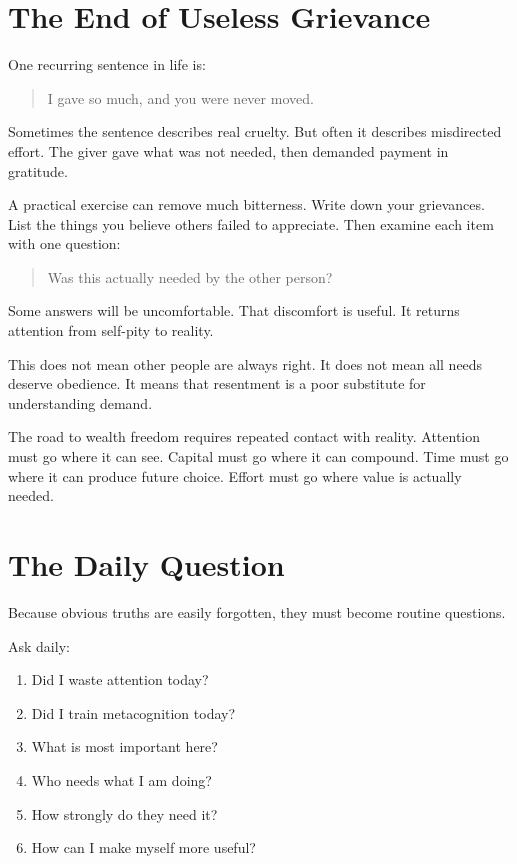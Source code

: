 \section*{The End of Useless Grievance}

One recurring sentence in life is:

\begin{quote}
I gave so much, and you were never moved.
\end{quote}

Sometimes the sentence describes real cruelty. But often it describes misdirected effort. The giver gave what was not needed, then demanded payment in gratitude.

A practical exercise can remove much bitterness. Write down your grievances. List the things you believe others failed to appreciate. Then examine each item with one question:

\begin{quote}
Was this actually needed by the other person?
\end{quote}

Some answers will be uncomfortable. That discomfort is useful. It returns attention from self-pity to reality.

This does not mean other people are always right. It does not mean all needs deserve obedience. It means that resentment is a poor substitute for understanding demand.

The road to wealth freedom requires repeated contact with reality. Attention must go where it can see. Capital must go where it can compound. Time must go where it can produce future choice. Effort must go where value is actually needed.

\section*{The Daily Question}

Because obvious truths are easily forgotten, they must become routine questions.

Ask daily:

\begin{enumerate}
\item Did I waste attention today?
\item Did I train metacognition today?
\item What is most important here?
\item Who needs what I am doing?
\item How strongly do they need it?
\item How can I make myself more useful?
\end{enumerate}

